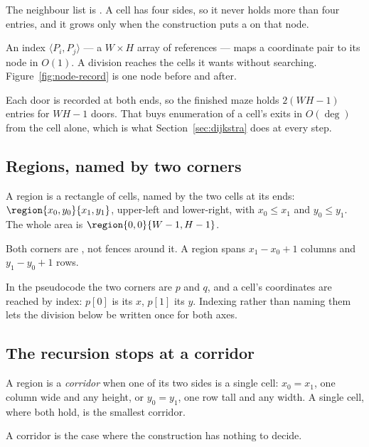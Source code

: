 The neighbour list is . A cell has four
sides, so it never holds more than four entries, and it grows only when the
construction puts a  on that node.

An index $\langle P_i,P_j\rangle$ --- a $W\times H$ array of references --- maps
a coordinate pair to its node in $O(1)$. A division reaches the cells it wants
without searching. Figure~\ref{fig:node-record} is one node before and after.



Each door is recorded at both ends, so the finished maze holds $2(WH-1)$ entries
for $WH-1$ doors. That buys enumeration of a cell's exits in $O(\deg)$ from the
cell alone, which is what Section~\ref{sec:dijkstra} does at every step.

\subsection{Regions, named by two corners}
\label{sec:regions}

A region is a rectangle of cells, named by the two cells at its ends:
$\region{x_0,y_0}{x_1,y_1}$, upper-left and lower-right, with $x_0\le x_1$ and
$y_0\le y_1$. The whole area is $\region{0,0}{W-1,H-1}$.

Both corners are , not fences around it. A region
spans $x_1-x_0+1$ columns and $y_1-y_0+1$ rows.

In the pseudocode the two corners are $p$ and $q$, and a cell's coordinates are
reached by index: $p[0]$ is its $x$, $p[1]$ its $y$. Indexing rather than naming
them lets the division below be written once for both axes.

\subsection{The recursion stops at a corridor}
\label{sec:corridor-base}

\begin{definition}[Corridor]
\label{def:corridor}
A region is a \emph{corridor} when one of its two sides is a single cell:
$x_0=x_1$, one column wide and any height, or $y_0=y_1$, one row tall and any
width. A single cell, where both hold, is the smallest corridor.
\end{definition}

A corridor is the case where the construction has nothing to decide.

